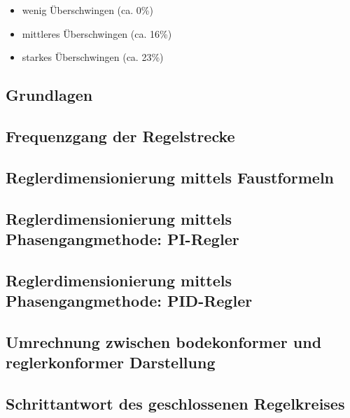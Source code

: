 \begin{itemize}
    \item
        wenig \"Uberschwingen (ca. 0\%)
    \item
        mittleres \"Uberschwingen (ca. 16\%)
    \item
        starkes \"Uberschwingen (ca. 23\%)
\end{itemize}

\subsection{Grundlagen}


\subsection{Frequenzgang der Regelstrecke}
\label{subs:frequenzgang}


\subsection{Reglerdimensionierung mittels Faustformeln}
\label{subs:faustformeln}


\subsection{Reglerdimensionierung mittels Phasengangmethode: PI-Regler}
\label{subs:phasengang:pi}


\subsection{Reglerdimensionierung mittels Phasengangmethode: PID-Regler}
\label{subs:phasengang:pid}


\subsection{Umrechnung zwischen bodekonformer und reglerkonformer Darstellung}
\label{subs:bode_regler}


\subsection{Schrittantwort des geschlossenen Regelkreises}

